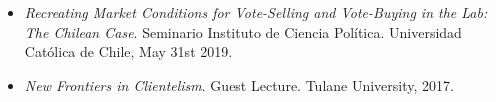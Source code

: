 \begin{itemize}
	\item \emph{Recreating Market Conditions for Vote-Selling and Vote-Buying in the Lab: The Chilean Case}. Seminario Instituto de Ciencia Pol\'itica. Universidad Cat\'olica de Chile, May 31st 2019.
	\item \emph{New Frontiers in Clientelism}. Guest Lecture. Tulane University, 2017.
\end{itemize}

